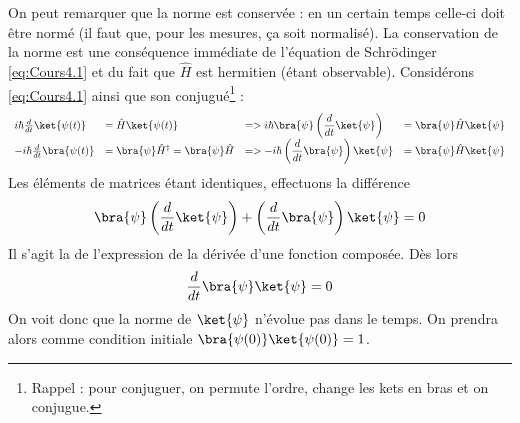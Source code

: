 On peut remarquer que la norme est conservée : en un certain temps celle-ci doit 
être normé (il faut que, pour les mesures, ça soit normalisé). La conservation de 
la norme est une conséquence immédiate de l'équation de Schrödinger \autoref{eq:Cours4.1} et du fait 
que $\hat{H}$ est hermitien (étant observable). Considérons \autoref{eq:Cours4.1} ainsi 
que son conjugué\footnote{Rappel : pour conjuguer, on permute l'ordre, change les kets en 
bras et on conjugue.} :
\begin{equation}
\begin{array}{llll}
i\hbar \frac{d}{dt}\ket{\psi(t)} &= \hat{H}\ket{\psi(t)} &=> i\hbar \bra{\psi}\left(
\dfrac{d}{dt}\ket{\psi}\right) &= \bra{\psi}\hat{H}\ket{\psi}\\
-i\hbar \frac{d}{dt}\bra{\psi(t)} &= \bra{\psi}\hat{H}^\dagger = \bra{\psi}\hat{H} &=>
-i\hbar \left(\dfrac{d}{dt}\bra{\psi}\right)\ket{\psi} &= \bra{\psi}\hat{H}\ket{\psi}
\end{array}
\end{equation}
Les éléments de matrices étant identiques, effectuons la différence
\begin{equation}
\bra{\psi}\left(\dfrac{d}{dt}\ket{\psi}\right)+\left(\dfrac{d}{dt}\bra{\psi}\right)\ket{\psi} = 0
\end{equation}
Il s'agit la de l'expression de la dérivée d'une fonction composée. Dès lors
\begin{equation}
\dfrac{d}{dt}\bra{\psi}\ket{\psi} = 0
\end{equation}
On voit donc que la norme de $\ket{\psi}$ n'évolue pas dans le temps.
On prendra alors comme condition initiale $\bra{\psi(0)}\ket{\psi(0)} = 1$.\\


